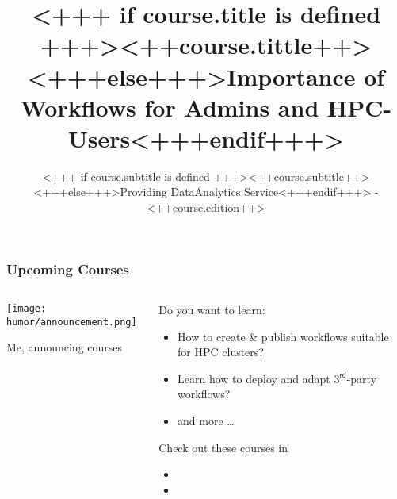 \documentclass[english,xcolor=pdftex,dvipsnames,aspectratio=<+++ if course.aspectratio is defined +++><++course.aspectratio++><+++else+++>43<+++endif+++>]{beamer}
\title[<++course.shorttitle++>]{<+++ if course.title is defined +++><++course.tittle++><+++else+++>Importance of \Snakemake Workflows for Admins and HPC-Users<+++endif+++>}
\subtitle{<+++ if course.subtitle is defined +++><++course.subtitle++><+++else+++>Providing DataAnalytics Service<+++endif+++> - <++course.edition++>}
\begin{document}

\sloppy

\begin{frame}[plain] %
  \titlepage
\end{frame}











\begin{frame}
	\frametitle{Upcoming Courses}
	\begin{columns}[T]
		\begin{column}{0.5\textwidth}
			\centering
			\texttt{[image: humor/announcement.png]}
			\caption{Me, announcing courses}
		\end{column}
	
	\begin{column}{0.5\textwidth}
		Do you want to learn:
		\begin{itemize}
			\item How to create \& publish \Snakemake workflows suitable for HPC clusters?
			\item Learn how to deploy and adapt $3^{\mathsf{rd}}$-party workflows?
			\item and more \ldots
		\end{itemize}
	    Check out these courses in
	    \begin{itemize}
	    	\item {}
	    	\item {}
	    \end{itemize}
	\end{column}
	
	\end{columns}
\end{frame}
      
\end{document}
